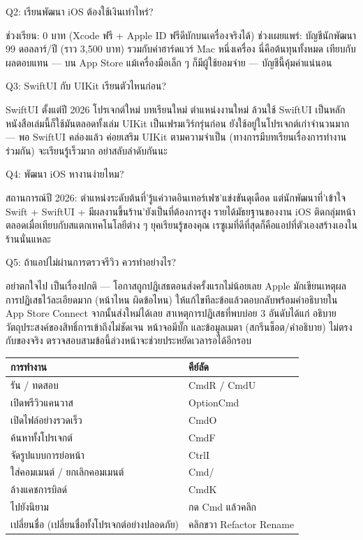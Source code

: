 Q2: เรียนพัฒนา iOS ต้องใช้เงินเท่าไหร่?

ช่วงเรียน: 0 บาท (Xcode ฟรี + Apple ID ฟรีดีบักบนเครื่องจริงได้) ช่วงเผยแพร่: บัญชีนักพัฒนา 99 ดอลลาร์/ปี (ราว 3,500 บาท) รวมกับค่าฮาร์ดแวร์ Mac หนึ่งเครื่อง นี่คือต้นทุนทั้งหมด เทียบกับผลตอบแทน — บน App Store แม้เครื่องมือเล็ก ๆ ก็มีผู้ใช้ยอมจ่าย — บัญชีนี้คุ้มค่าแน่นอน

Q3: SwiftUI กับ UIKit เรียนตัวไหนก่อน?

SwiftUI ตั้งแต่ปี 2026 โปรเจกต์ใหม่ บทเรียนใหม่ ตำแหน่งงานใหม่ ล้วนใช้ SwiftUI เป็นหลัก หนังสือเล่มนี้ก็ใช้มันตลอดทั้งเล่ม UIKit เป็นเฟรมเวิร์กรุ่นก่อน ยังใช้อยู่ในโปรเจกต์เก่าจำนวนมาก — พอ SwiftUI คล่องแล้ว ค่อยเสริม UIKit ตามความจำเป็น (ทางการมีบทเรียนเรื่องการทำงานร่วมกัน) จะเรียนรู้เร็วมาก อย่าสลับลำดับกันนะ

Q4: พัฒนา iOS หางานง่ายไหม?

สถานการณ์ปี 2026: ตำแหน่งระดับต้นที่'รู้แค่วาดอินเทอร์เฟซ'แข่งขันดุเดือด แต่นักพัฒนาที่'เข้าใจ Swift + SwiftUI + มีผลงานขึ้นร้าน'ยังเป็นที่ต้องการสูง รายได้มัธยฐานของงาน iOS ติดกลุ่มหน้าตลอดเมื่อเทียบกับสแตกเทคโนโลยีต่าง ๆ ยุคเรียนรู้ของคุณ เรซูเมที่ดีที่สุดก็คือแอปที่ตัวเองสร้างเองในร้านนั่นแหละ

Q5: ถ้าแอปไม่ผ่านการตรวจรีวิว ควรทำอย่างไร?

อย่าตกใจไป เป็นเรื่องปกติ — โอกาสถูกปฏิเสธตอนส่งครั้งแรกไม่น้อยเลย Apple มักเขียนเหตุผลการปฏิเสธไว้ละเอียดมาก (หน้าไหน ผิดข้อไหน) ให้แก้ไขทีละข้อแล้วตอบกลับพร้อมคำอธิบายใน App Store Connect จากนั้นส่งใหม่ได้เลย สาเหตุการปฏิเสธที่พบบ่อย 3 อันดับได้แก่ อธิบายวัตถุประสงค์ของสิทธิ์การเข้าถึงไม่ชัดเจน หน้าจอมีบั๊ก และข้อมูลเมตา (สกรีนช็อต/คำอธิบาย) ไม่ตรงกับของจริง ตรวจสอบสามข้อนี้ล่วงหน้าจะช่วยประหยัดเวลารอได้อีกรอบ


\begin{center}
\begin{tabularx}{\linewidth}{|X|X|}
\hline
\textbf{การทำงาน} & \textbf{คีย์ลัด} \tabularnewline
\hline
รัน / ทดสอบ & CmdR / CmdU \tabularnewline
เปิดพรีวิวแคนวาส & OptionCmd \tabularnewline
เปิดไฟล์อย่างรวดเร็ว & CmdO \tabularnewline
ค้นหาทั้งโปรเจกต์ & CmdF \tabularnewline
จัดรูปแบบการย่อหน้า & CtrlI \tabularnewline
ใส่คอมเมนต์ / ยกเลิกคอมเมนต์ & Cmd/ \tabularnewline
ล้างแคชการบิลด์ & CmdK \tabularnewline
ไปยังนิยาม & กด Cmd แล้วคลิก \tabularnewline
เปลี่ยนชื่อ (เปลี่ยนชื่อทั้งโปรเจกต์อย่างปลอดภัย) & คลิกขวา Refactor Rename \tabularnewline
\hline
\end{tabularx}
\end{center}


